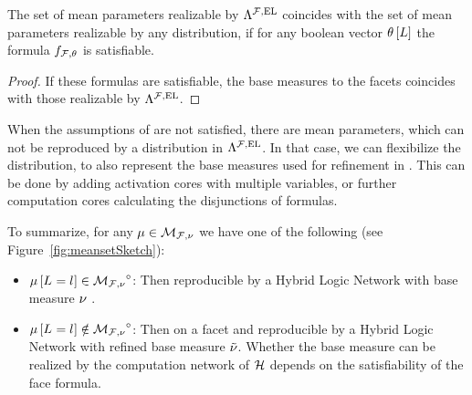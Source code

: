 \begin{theorem}\label{the:sufficientHLNExpressivity}
	The set of mean parameters realizable by $\Lambda^{\mathcal{F},\mathrm{EL}}$ coincides with the set of mean parameters realizable by any distribution, if for any boolean vector $\theta\left[L\right]$ the formula $f_{\mathcal{F},\theta}$ is satisfiable.
\end{theorem}
\begin{proof}
		If these formulas are satisfiable, the base measures to the facets coincides with those realizable by $\Lambda^{\mathcal{F},\mathrm{EL}}$.
\end{proof}



When the assumptions of  are not satisfied, there are mean parameters, which can not be reproduced by a distribution in $\Lambda^{\mathcal{F},\mathrm{EL}}$.
In that case, we can flexibilize the distribution, to also represent the base measures used for refinement in .
This can be done by adding activation cores with multiple variables, or further computation cores calculating the disjunctions of formulas.


To summarize, for any $\mu\in\mathcal{M}_{\mathcal{F},\nu}$ we have one of the following (see Figure~\ref{fig:meansetSketch}):
\begin{itemize}
	\item $\mu\left[L_{}=l_{}\right]\in{\mathcal{M}_{\mathcal{F},\nu}}^{\circ}$: Then reproducible by a Hybrid Logic Network with base measure $\nu$ .
	\item  $\mu\left[L_{}=l_{}\right]\notin{\mathcal{M}_{\mathcal{F},\nu}}^{\circ}$:
		Then on a facet and reproducible by a Hybrid Logic Network with refined base measure $\tilde{\nu}$.
		Whether the base measure can be realized by the computation network of $\mathcal{H}$ depends on the satisfiability of the face formula.
\end{itemize}




